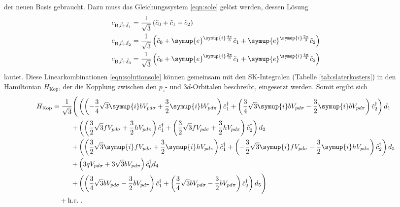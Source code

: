der neuen Basis gebraucht. 
Dazu muss das Gleichungssystem \eqref{eqn:sole} gelöst werden, dessen Lösung    
\begin{equation}
    \begin{aligned}
    c_{\text{B},\vec{l}+\vec{\delta}_1} &= \frac{1}{\sqrt{3}}\left (\tilde{c}_0 + \tilde{c}_1 + \tilde{c}_2 \right ) \\
    c_{\text{B},\vec{l}+\vec{\delta}_2} &= \frac{1}{\sqrt{3}}\left (\tilde{c}_0 + \symup{e}^{\symup{i}\frac{4\pi}{3}} \tilde{c}_1 + \symup{e}^{\symup{i}\frac{2\pi}{3}} \tilde{c}_2 \right ) \\
    c_{\text{B},\vec{l}+\vec{\delta}_3} &= \frac{1}{\sqrt{3}}\left (\tilde{c}_0 + \symup{e}^{\symup{i}\frac{2\pi}{3}} \tilde{c}_1 + \symup{e}^{\symup{i}\frac{4\pi}{3}} \tilde{c}_2 \right ) 
    \label{eqn:solutionsole}
    \end{aligned}
\end{equation}
lautet.
Diese Linearkombinationen \eqref{eqn:solutionsole} können gemeinsam mit den SK-Integralen (Tabelle \ref{tab:slaterkosters}) in den Hamiltonian $H_\text{Kop}$, der die Kopplung 
zwischen den $p_z$- und $3d$-Orbitalen beschreibt, eingesetzt werden.
Somit ergibt sich 
\begin{equation}
    \begin{split}
    H_\text{Kop} = \frac{1}{\sqrt{3}} 
        \Biggl(  &\left ( \left   (-\frac{3}{4}\sqrt{3}   \symup{i}    b   V_{pd\sigma} + \frac{3}{2}  \symup{i}   b   V_{pd\pi} \right ) \tilde{c}^\dagger_1  
                    +\left  ( \frac{3}{4}\sqrt{3}   \symup{i}    b   V_{pd\sigma} - \frac{3}{2}  \symup{i}   b   V_{pd\pi} \right ) \tilde{c}^\dagger_2 \right )            d_1\\
        +&\left (    \left  ( \frac{3}{2}\sqrt{3}                           f   V_{pd\sigma} + \frac{3}{2}              h   V_{pd\pi} \right ) \tilde{c}^\dagger_1          
                    +\left  ( \frac{3}{2}\sqrt{3}                           f   V_{pd\sigma} + \frac{3}{2}              h   V_{pd\pi} \right ) \tilde{c}^\dagger_2 \right ) d_2\\
        +&\left (    \left  ( \frac{3}{2}\sqrt{3}               \symup{i}   f   V_{pd\sigma} + \frac{3}{2}  \symup{i}   h   V_{pd\pi} \right ) \tilde{c}^\dagger_1  
                    +\left  (-\frac{3}{2}\sqrt{3}               \symup{i}   f   V_{pd\sigma} - \frac{3}{2}  \symup{i}   h   V_{pd\pi} \right ) \tilde{c}^\dagger_2 \right ) d_3\\
        +&\left (   3 q V_{pd\sigma} + 3 \sqrt{3}  b V_{pd\pi} \right )    \tilde{c}^\dagger_0                                                                              d_4\\
        +&\left (   \left   ( \frac{3}{4}\sqrt{3}                           b   V_{pd\sigma} - \frac{3}{2}              b   V_{pd\pi} \right ) \tilde{c}^\dagger_1  
                    +\left  ( \frac{3}{4}\sqrt{3}                           b   V_{pd\sigma} - \frac{3}{2}              b   V_{pd\pi} \right ) \tilde{c}^\dagger_2 \right ) d_5 \Biggr) \\
                    & \! \! \! \!  \! \! \! \!  \! \! \! \! \! \! \! \! + \text{h.c.} \; .
                 \end{split}
      \label{eqn:lcinhamiltonian}
\end{equation} 
